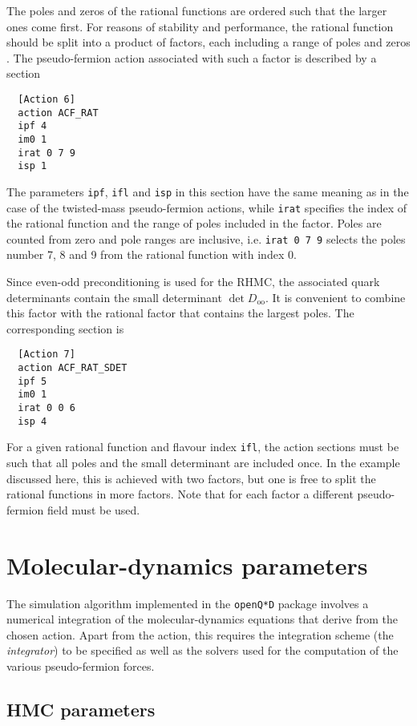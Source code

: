 \documentclass[11pt,fleqn]{article}
\begin{document}
The poles and zeros of the rational functions are ordered such that the larger
ones come first. For reasons of stability and performance, the rational function
should be split into a product of factors, each including a range of poles and
zeros \cite{rhmc}. The pseudo-fermion action associated with such a factor is
described by a section
%
\begin{verbatim}
  [Action 6]
  action ACF_RAT
  ipf 4
  im0 1
  irat 0 7 9
  isp 1
\end{verbatim}
%
The parameters \texttt{ipf}, \texttt{ifl} and \texttt{isp} in this section have
the same meaning as in the case of the twisted-mass pseudo-fermion actions,
while \texttt{irat} specifies the index of the rational function and the range
of poles included in the factor. Poles are counted from zero and pole ranges are
inclusive, i.e. \texttt{irat 0 7 9} selects the poles number 7, 8 and 9 from the
rational function with index 0.

Since even-odd preconditioning is used for the RHMC, the associated quark
determinants contain the small determinant $\det D_\text{oo}$. It is convenient
to combine this factor with the rational factor that contains the largest poles.
The corresponding section is
%
\begin{verbatim}
  [Action 7]
  action ACF_RAT_SDET
  ipf 5
  im0 1
  irat 0 0 6
  isp 4
\end{verbatim}
%
For a given rational function and flavour index \texttt{ifl}, the action
sections must be such that all poles and the small determinant are included
once. In the example discussed here, this is achieved with two factors, but one
is free to split the rational functions in more factors. Note that for each
factor a different pseudo-fermion field must be used.




\section{Molecular-dynamics parameters}
\label{sec:md}

The simulation algorithm implemented in the \texttt{openQ*D} package involves a
numerical integration of the molecular-dynamics equations that derive from the
chosen action. Apart from the action, this requires the integration scheme (the
\textit{integrator}) to be specified as well as the solvers used for the
computation of the various pseudo-fermion forces.

\subsection{HMC parameters}
\label{subsec:md:hmc}
\end{document}
